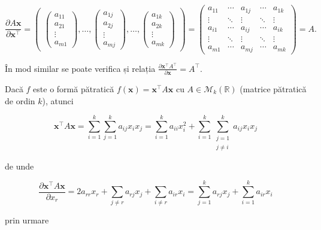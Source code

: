 \documentclass[]{article}
\begin{document}
\[
  \frac{\partial A \boldsymbol x}{\partial \boldsymbol x^\intercal} = \begin{pmatrix}\begin{pmatrix}a_{11}\\
  a_{21}\\
  \vdots\\
  a_{m1}\end{pmatrix}, \ldots, \begin{pmatrix}a_{1j}\\
  a_{2j}\\
  \vdots\\
  a_{mj}\end{pmatrix}, \ldots, \begin{pmatrix}a_{1k}\\
  a_{2k}\\
  \vdots\\
  a_{mk}\end{pmatrix}\end{pmatrix} = \begin{pmatrix}a_{11} & \cdots & a_{1j} & \cdots & a_{1k}\\
  \vdots & \ddots & \vdots & \ddots & \vdots\\
  a_{i1} & \cdots & a_{ij} & \cdots & a_{ik}\\
  \vdots & \ddots & \vdots & \ddots & \vdots\\
  a_{m1} & \cdots & a_{mj} & \cdots & a_{mk}
  \end{pmatrix} = A.
\]

În mod similar se poate verifica și relația
\(\frac{\partial \boldsymbol x^\intercal A^\intercal}{\partial \boldsymbol x} = A^\intercal\).

Dacă \(f\) este o formă pătratică
\(f(\boldsymbol x) = \boldsymbol x^\intercal A \boldsymbol x\) cu
\(A\in\mathcal{M}_{k}(\mathbb{R})\) (matrice pătratică de ordin \(k\)),
atunci

\[
  \boldsymbol x^\intercal  A \boldsymbol x = \sum_{i = 1}^{k}\sum_{j = 1}^{k}a_{ij}x_ix_j = \sum_{i = 1}^{k}a_{ii}x_i^2 + \sum_{i = 1}^{k}\sum_{\substack{j = 1\\ j\neq i}}^{k}a_{ij}x_ix_j 
\]

de unde

\[
  \frac{\partial \boldsymbol x^\intercal  A \boldsymbol x}{\partial x_r} = 2 a_{rr}x_r + \sum_{j\neq r}a_{rj}x_j + \sum_{i\neq r}a_{ir}x_i = \sum_{j = 1}^{k}a_{rj}x_j + \sum_{i = 1}^{k}a_{ir}x_i
\]

prin urmare
\end{document}
